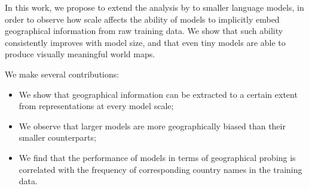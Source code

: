 In this work, we propose to extend the analysis by \citet{gurnee2023language} to smaller language models, in order to observe how scale affects the ability of models to implicitly embed geographical information from raw training data. We show that such ability consistently improves with model size, and that even tiny models are able to produce visually meaningful world maps.

We make several contributions:
\begin{itemize}
    \item We show that geographical information can be extracted to a certain extent from representations at every model scale;
    \item We observe that larger models are more geographically biased than their smaller counterparts;
    \item We find that the performance of models in terms of geographical probing is correlated with the frequency of corresponding country names in the training data.
\end{itemize} 

